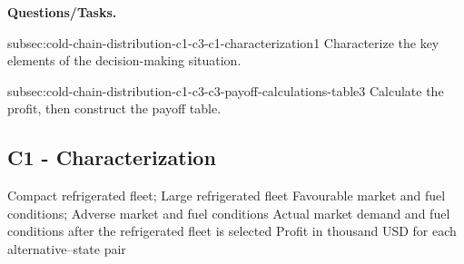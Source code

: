 {	\textbf{Questions/Tasks.}
	\begin{enumerate}
		\CriterionTask
		{subsec:cold-chain-distribution-c1-c3-c1-characterization}{1}
		{Characterize the key elements of the decision-making situation. }

		\CriterionTask
		{subsec:cold-chain-distribution-c1-c3-c3-payoff-calculations-table}{3}
		{Calculate the profit, then construct the payoff table. }
	\end{enumerate}

	\label{subsec:cold-chain-distribution-c1-c3-c1-characterization}
	\subsection*{C1 - Characterization }
	
	\DecisionElementsTable
		{Compact refrigerated fleet; Large refrigerated fleet}
		{Favourable market and fuel conditions; Adverse market and fuel conditions}
		{Actual market demand and fuel conditions after the refrigerated fleet is selected}
		{Profit in thousand USD for each alternative--state pair}

}
